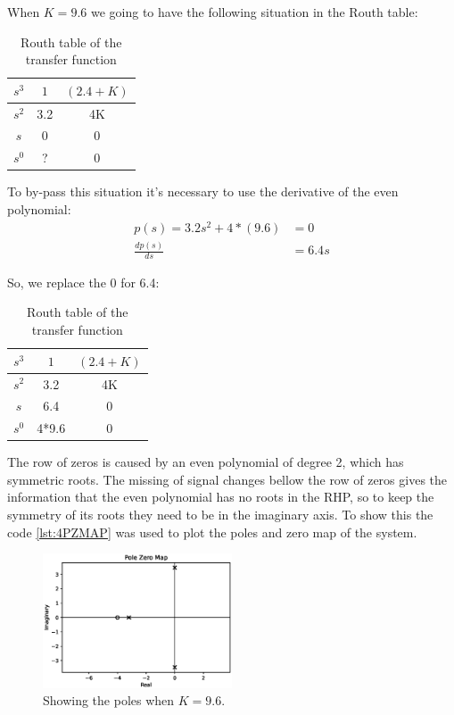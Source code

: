 \documentclass[a4paper]{article}
\begin{document}
When $K =9.6$ we going to have the following situation in the Routh table:
\begin{table}[H]
    \centering
    \begin{tabular}{|c|c|c|}
	\hline    
    $s^3$  & $1$ & $(2.4+K)$  \\
    \hline
    $s^2$    &  3.2 & 4K  \\
    \hline
    $s$ & 0 &0 \\
    \hline
    $s^0$ & ? &0 \\
    \hline
    \end{tabular}
    \caption{Routh table of the transfer function}
    \label{tab:EXE_2_ROUTH_TABLE_2}
\end{table}
To by-pass this situation it's necessary to use the derivative of the even polynomial:
\begin{align*}
    p(s)=3.2s^2+4*(9.6)&=0\\
    \frac{d p(s)}{ds}&=6.4s
\end{align*}

So, we replace the 0 for 6.4:
\begin{table}[H]
    \centering
    \begin{tabular}{|c|c|c|}
	\hline    
    $s^3$  & $1$ & $(2.4+K)$  \\
    \hline
    $s^2$    &  3.2 & 4K  \\
    \hline
    $s$ & 6.4 &0 \\
    \hline
    $s^0$ & 4*9.6 &0 \\
    \hline
    \end{tabular}
    \caption{Routh table of the transfer function}
    \label{tab:EXE_3_ROUTH_TABLE_3}
\end{table}

The row of zeros is caused by an even polynomial of degree 2, which has symmetric roots. The missing of signal changes bellow the row of zeros gives the information that the even polynomial has no roots in the RHP, so to keep the symmetry of its roots they need to be in the imaginary axis. To show this the code \ref{lst:4PZMAP} was used to plot the poles and zero map of the system.
 
\begin{figure}[H]
        \centering
        \includegraphics[width=0.5\textwidth]{Figures/Question4/EXE_4_ITEM_3.eps}
        \caption{Showing the poles when $K=9.6$.}
        \label{fig:EXE_POLES_MARGINALLY}
    \end{figure}
\end{document}
